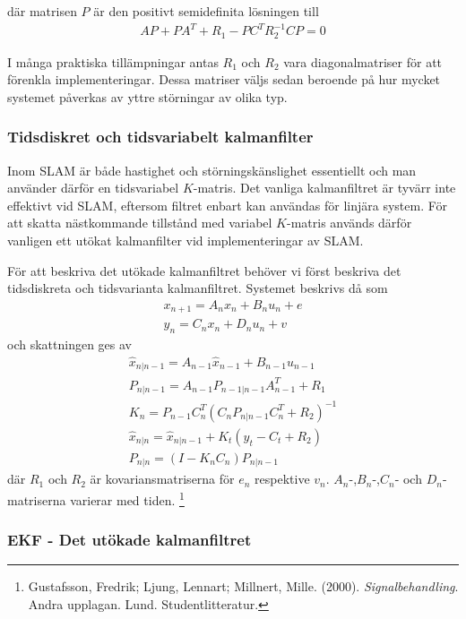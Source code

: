 \documentclass[a4paper,12pt,fleqn]{article}
\begin{document}
där matrisen $P$ är den positivt semidefinita lösningen till 
\begin{gather}
AP + PA^{T} + R_{1} - PC^{T}R_{2}^{-1}CP = 0
\end{gather}

I många praktiska tillämpningar antas $R_{1}$ och $R_{2}$ vara diagonalmatriser för att förenkla implementeringar. Dessa matriser väljs sedan beroende på hur mycket systemet påverkas av yttre störningar av olika typ. 

\subsubsection{Tidsdiskret och tidsvariabelt kalmanfilter} Inom SLAM är både hastighet och störningskänslighet essentiellt och man använder därför en tidsvariabel $K$-matris. Det vanliga kalmanfiltret är tyvärr inte effektivt vid SLAM, eftersom filtret enbart kan användas för linjära system. För att skatta nästkommande tillstånd med variabel $K$-matris används därför vanligen ett utökat kalmanfilter vid implementeringar av SLAM. 

För att beskriva det utökade kalmanfiltret behöver vi först beskriva det tidsdiskreta och tidsvarianta kalmanfiltret. Systemet beskrivs då som 
\begin{gather}
x_{n+1} = A_nx_n + B_nu_n+e \\
y_n = C_nx_n + D_nu_n + v
\end{gather}
och skattningen ges av
\begin{gather}
	\hat{x}_{n|n-1} = A_{n-1}\hat{x}_{n-1} + B_{n-1}u_{n-1} \\
	P_{n|n-1}=A_{n-1}P_{n-1|n-1}A^T_{n-1}+R_1 \\
	K_n = P_{n-1}C_{n}^T(C_{n}P_{n|n-1}C_{n}^T+R_2)^{-1}	\\
	\hat{x}_{n|n} = \hat{x}_{n|n-1} + K_{t}(y_{t}-C_{t}+R_{2})\\
	P_{n|n}=(I-K_nC_n)P_{n|n-1}	
\end{gather}
där $R_1$ och $R_2$ är kovariansmatriserna för $e_n$ respektive $v_n$. $A_n$-,$B_n$-,$C_n$- och $D_n$-matriserna varierar med tiden. \footnote{Gustafsson, Fredrik; Ljung, Lennart; Millnert, Mille. (2000). \textit{Signalbehandling}. Andra upplagan. Lund. Studentlitteratur.
}

\subsubsection{EKF - Det utökade kalmanfiltret}
\end{document}
